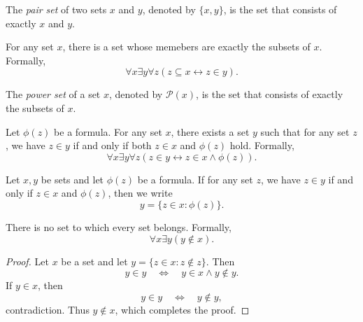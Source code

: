 \begin{definition}
  The \emph{pair set} of two sets $x$ and $y$, denoted by $\{x, y\}$, is the
  set that consists of exactly $x$ and $y$.
\end{definition}

\begin{axiom}
  For any set $x$, there is a set whose memebers are exactly the subsets
  of $x$.
  Formally,
  \begin{equation*}
    \forall x \exists y \forall z (z \subseteq x \leftrightarrow z \in y).
  \end{equation*}
\end{axiom}

\begin{definition}
  The \emph{power set} of a set $x$, denoted by $\mathcal{P}(x)$, is the set
  that consists of exactly the subsets of $x$.
\end{definition}

\begin{axiom}
  Let $\phi(z)$ be a formula.
  For any set $x$, there exists a set $y$ such that for any set $z$, we have
  $z \in y$ if and only if both $z \in x$ and $\phi(z)$ hold.
  Formally,
  \begin{equation*}
    \forall x \exists y \forall z (z \in y \leftrightarrow z \in x \wedge
    \phi(z)).
  \end{equation*}
\end{axiom}

\begin{definition}
  Let $x, y$ be sets and let $\phi(z)$ be a formula.
  If for any set $z$, we have $z \in y$ if and only if $z \in x$ and $\phi(z)$,
  then we write
  \begin{equation*}
    y = \{z \in x: \phi(z)\}.
  \end{equation*}
\end{definition}

\begin{theorem}
  There is no set to which every set belongs.
  Formally,
  \begin{equation*}
    \forall x \exists y (y \notin x).
  \end{equation*}
\end{theorem}
\begin{proof}
  Let $x$ be a set and let $y = \{z \in x: z \notin z\}$.
  Then
  \begin{equation*}
    y \in y
    \quad \Leftrightarrow \quad
    y \in x \wedge y \notin y.
  \end{equation*}
  If $y \in x$, then
  \begin{equation*}
    y \in y \quad \Leftrightarrow \quad y \notin y,
  \end{equation*}
  contradiction.
  Thus $y \notin x$, which completes the proof.
\end{proof}


